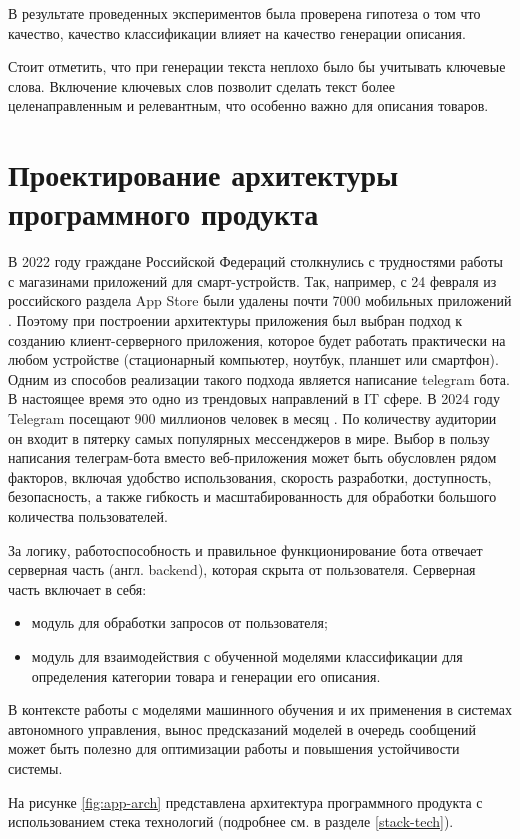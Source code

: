 \documentclass[a4paper,12pt]{extarticle}
\begin{document}
В результате проведенных экспериментов была проверена гипотеза о том что качество, качество классификации влияет на качество генерации описания.

Стоит отметить, что при генерации текста неплохо было бы учитывать ключевые слова. Включение ключевых слов позволит сделать текст более целенаправленным и релевантным, что особенно важно для описания товаров.

\newpage
\newpage
\section{Проектирование архитектуры программного продукта}
В 2022 году граждане Российской Федераций столкнулись с трудностями работы с магазинами приложений для смарт-устройств. Так, например, с 24 февраля из российского раздела App Store были удалены почти 7000 мобильных приложений \cite{russiaapp}. Поэтому при построении архитектуры приложения был выбран подход к созданию клиент-серверного приложения, которое будет работать практически на любом устройстве (стационарный компьютер, ноутбук, планшет или смартфон). Одним из способов реализации такого подхода является написание telegram  бота. В настоящее время это одно из трендовых направлений в IT сфере. В 2024 году Telegram посещают 900 миллионов человек в месяц \cite{telegram-stats}. По количеству аудитории он входит в пятерку самых популярных мессенджеров в мире. Выбор в пользу написания телеграм-бота вместо веб-приложения может быть обусловлен рядом факторов, включая удобство использования, скорость разработки, доступность, безопасность, а также гибкость и масштабированность для обработки большого количества пользователей.

За логику, работоспособность и правильное функционирование бота 
отвечает серверная часть (англ. backend), которая скрыта от пользователя. Серверная часть включает в себя:
\begin{itemize}
	\item модуль для обработки запросов от пользователя;
	\item модуль для взаимодействия с обученной моделями классификации для определения категории товара и генерации его описания.
\end{itemize}

В контексте работы с моделями машинного обучения и их применения в системах автономного управления, вынос предсказаний моделей в очередь сообщений может быть полезно для оптимизации работы и повышения устойчивости системы.

На рисунке \ref{fig:app-arch} представлена архитектура программного продукта с использованием стека технологий (подробнее см. в разделе \ref{stack-tech}).
\end{document}
